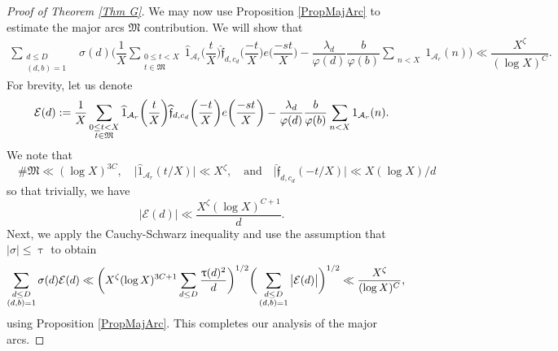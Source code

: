 \documentclass[12pt]{amsart}
\numberwithin{equation}{section}
\theoremstyle{remark}
\theoremstyle{definition}
\begin{document}
\begin{proof}[Proof of Theorem \ref{Thm G}]
We may now use Proposition \ref{PropMajArc} to estimate the major arcs $\mathfrak{M}$ contribution. We will show that
\begin{align}
\label{Thm7eq2} \sum_{\substack{d\leq D\\(d, b)=1}}&{\sigma}(d)\bigg(\dfrac{1}{X}\sum_{\substack{0\leq t<X\\t\in \mathfrak{M}}}\widehat{1}_{\mathcal{A}_r}\bigg(\dfrac{t}{X}\bigg)\widehat{\mathfrak{f}}_{d, c_d}\bigg(\dfrac{-t}{X}\bigg)e\bigg(\dfrac{-st}{X}\bigg)-\dfrac{ \lambda_{d}}{\varphi(d)}\dfrac{b}{\varphi(b)}\sum_{\substack{n< X}}1_{\mathcal{A}_r}(n)\bigg)\ll \dfrac{X^\zeta}{(\log X)^C}.
\end{align}
For brevity, let us denote
\begin{align}
\notag \mathcal{E}(d):=\dfrac{1}{X}\sum_{\substack{0\leq t<X\\t\in \mathfrak{M}}}\widehat{1}_{\mathcal{A}_r}\bigg(\dfrac{t}{X}\bigg)\widehat{\mathfrak{f}}_{d, c_d}\bigg(\dfrac{-t}{X}\bigg)e\bigg(\dfrac{-st}{X}\bigg)-\dfrac{ \lambda_{d}}{\varphi(d)}\dfrac{b}{\varphi(b)}\sum_{\substack{n< X}}1_{\mathcal{A}_r}(n).
\end{align}
We note that
\[\quad \#\mathfrak{M} \ll (\log X)^{3C},\quad  \big|\widehat{1}_{\mathcal{A}_r}(t/X)\big| \ll X^\zeta,\quad \text{and}\quad  \big|\widehat{\mathfrak{f}}_{d, c_d}(-t/X)\big| \ll X(\log X)/d\]
so that trivially, we have
\[|\mathcal{E}(d)| \ll \dfrac{X^\zeta(\log X)^{C+1}}{d}.\]
Next, we apply the Cauchy-Schwarz inequality and use the assumption that $|\sigma|\leq \uptau$ to obtain
\begin{align}
\notag \sum_{\substack{d\leq D\\(d, b)=1}}{\sigma}(d)\mathcal{E}(d)  &\ll \bigg(X^\zeta(\log X)^{3C+1}\sum_{d\leq D}\dfrac{\uptau(d)^2}{d}\bigg)^{1/2}\bigg(\sum_{\substack{d\leq D\\(d, b)=1}}\big|\mathcal{E}(d)\big|\bigg)^{1/2} \ll \dfrac{X^{\zeta}}{(\log X)^C},
\end{align}
using Proposition \ref{PropMajArc}. This completes our analysis of the major arcs.



\end{proof}
\end{document}
